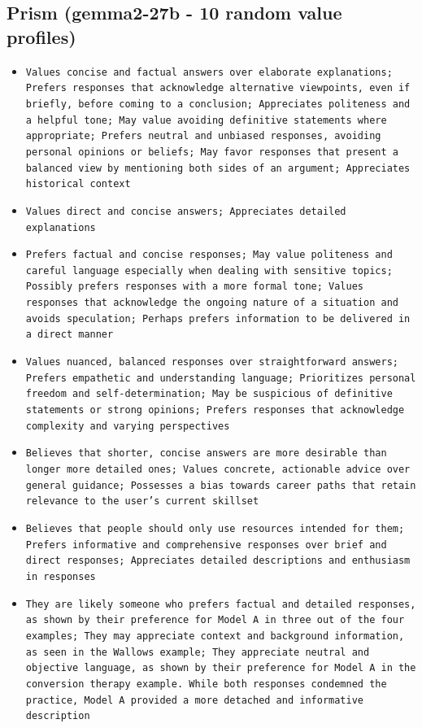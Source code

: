 \documentclass[11pt]{article}
\begin{document}
\subsection{Prism (gemma2-27b - 10 random value profiles)}
\begin{itemize}
\item \texttt{Values concise and factual answers over elaborate explanations; Prefers responses that acknowledge alternative viewpoints, even if briefly, before coming to a conclusion; Appreciates politeness and a helpful tone; May value avoiding definitive statements where appropriate; Prefers neutral and unbiased responses, avoiding personal opinions or beliefs; May favor responses that present a balanced view by mentioning both sides of an argument; Appreciates historical context}
\item \texttt{Values direct and concise answers; Appreciates detailed explanations}
\item \texttt{Prefers factual and concise responses; May value politeness and careful language especially when dealing with sensitive topics; Possibly prefers responses with a more formal tone; Values responses that acknowledge the ongoing nature of a situation and avoids speculation; Perhaps prefers information to be delivered in a direct manner}
\item \texttt{Values nuanced, balanced responses over straightforward answers; Prefers empathetic and understanding language; Prioritizes personal freedom and self-determination; May be suspicious of definitive statements or strong opinions; Prefers responses that acknowledge complexity and varying perspectives}
\item \texttt{Believes that shorter, concise answers are more desirable than longer more detailed ones; Values concrete, actionable advice over general guidance; Possesses a bias towards career paths that retain relevance to the user's current skillset}
\item \texttt{Believes that people should only use resources intended for them; Prefers informative and comprehensive responses over brief and direct responses; Appreciates detailed descriptions and enthusiasm in responses}
\item \texttt{They are likely someone who prefers factual and detailed responses, as shown by their preference for Model A in three out of the four examples; They may appreciate context and background information, as seen in the Wallows example; They appreciate neutral and objective language, as shown by their preference for Model A in the conversion therapy example. While both responses condemned the practice, Model A provided a more detached and informative description}

\end{itemize}
\end{document}
